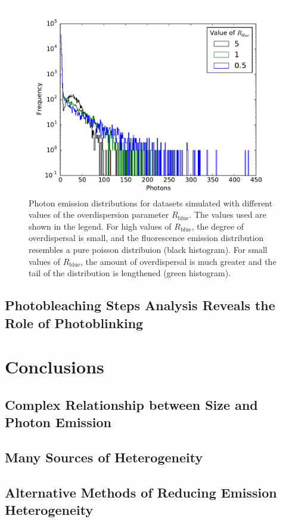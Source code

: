 \begin{figure}
   \begin{center}
      \includegraphics*[clip=true, width=6in]{sizing/varying_R_blue.pdf}
      \caption{Photon emission distributions for datasets simulated with different values of the overdispersion parameter $R_{\text{blue}}$. The values used are shown in the legend. For high values of $R_{\text{blue}}$, the degree of overdispersal is small, and the fluorescence emission distribution resembles a pure poisson distribuion (black histogram). For small values of $R_{\text{blue}}$, the amount of overdispersal is much greater and the tail of the distribution is lengthened (green histogram).} 
      \label{fig:R_blue}
   \end{center}
\end{figure}

\subsection{Photobleaching Steps Analysis Reveals the Role of Photoblinking}

\section{Conclusions}
\subsection{Complex Relationship between Size and Photon Emission}
\subsection{Many Sources of Heterogeneity}
\subsection{Alternative Methods of Reducing Emission Heterogeneity}